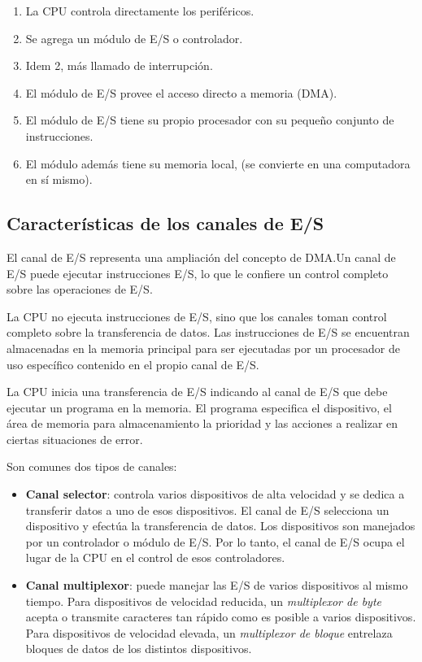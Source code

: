 \begin{enumerate}
  \item La CPU controla directamente los periféricos.
  \item Se agrega un módulo de E/S o controlador.
  \item Idem 2, más llamado de interrupción.
  \item El módulo de E/S provee el acceso directo a memoria (DMA).
  \item El módulo de E/S tiene su propio procesador con su pequeño conjunto de instrucciones.
  \item El módulo además tiene su memoria local, (se convierte en una computadora en sí mismo).
\end{enumerate}

\subsection*{Características de los canales de E/S}

El canal de E/S representa una ampliación del concepto de DMA.\@ Un canal de E/S puede ejecutar instrucciones E/S, lo que le confiere un control completo sobre las operaciones de E/S.

La CPU no ejecuta instrucciones de E/S, sino que los canales toman control completo sobre la transferencia de datos. Las instrucciones de E/S se encuentran almacenadas en la memoria principal para ser ejecutadas por un procesador de uso específico contenido en el propio canal de E/S.

La CPU inicia una transferencia de E/S indicando al canal de E/S que debe ejecutar un programa en la memoria. El programa especifica el dispositivo, el área de memoria para almacenamiento la prioridad y las acciones a realizar en ciertas situaciones de error.

Son comunes dos tipos de canales:

\begin{itemize}
  \item \textbf{Canal selector}: controla varios dispositivos de alta velocidad y se dedica a transferir datos a uno de esos dispositivos. El canal de E/S selecciona un dispositivo y efectúa la transferencia de datos. Los dispositivos son manejados por un controlador o módulo de E/S. Por lo tanto, el canal de E/S ocupa el lugar de la CPU en el control de esos controladores.
  \item \textbf{Canal multiplexor}: puede manejar las E/S de varios dispositivos al mismo tiempo. Para dispositivos de velocidad reducida, un \textit{multiplexor de byte} acepta o transmite caracteres tan rápido como es posible a varios dispositivos. Para dispositivos de velocidad elevada, un \textit{multiplexor de bloque} entrelaza bloques de datos de los distintos dispositivos.
\end{itemize}